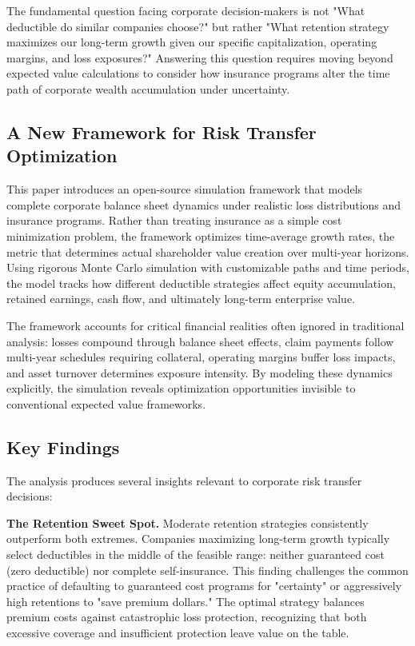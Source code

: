 \documentclass[11pt,letterpaper]{article}
\begin{document}
The fundamental question facing corporate decision-makers is not "What deductible do similar companies choose?" but rather "What retention strategy maximizes our long-term growth given our specific capitalization, operating margins, and loss exposures?" Answering this question requires moving beyond expected value calculations to consider how insurance programs alter the time path of corporate wealth accumulation under uncertainty.

\subsection{A New Framework for Risk Transfer Optimization}

This paper introduces an open-source simulation framework that models complete corporate balance sheet dynamics under realistic loss distributions and insurance programs. Rather than treating insurance as a simple cost minimization problem, the framework optimizes time-average growth rates, the metric that determines actual shareholder value creation over multi-year horizons. Using rigorous Monte Carlo simulation with customizable paths and time periods, the model tracks how different deductible strategies affect equity accumulation, retained earnings, cash flow, and ultimately long-term enterprise value.

The framework accounts for critical financial realities often ignored in traditional analysis: losses compound through balance sheet effects, claim payments follow multi-year schedules requiring collateral, operating margins buffer loss impacts, and asset turnover determines exposure intensity. By modeling these dynamics explicitly, the simulation reveals optimization opportunities invisible to conventional expected value frameworks.

\subsection{Key Findings}

The analysis produces several insights relevant to corporate risk transfer decisions:

\vspace{\baselineskip}

\textbf{The Retention Sweet Spot.} Moderate retention strategies consistently outperform both extremes. Companies maximizing long-term growth typically select deductibles in the middle of the feasible range: neither guaranteed cost (zero deductible) nor complete self-insurance. This finding challenges the common practice of defaulting to guaranteed cost programs for "certainty" or aggressively high retentions to "save premium dollars." The optimal strategy balances premium costs against catastrophic loss protection, recognizing that both excessive coverage and insufficient protection leave value on the table.
\end{document}

